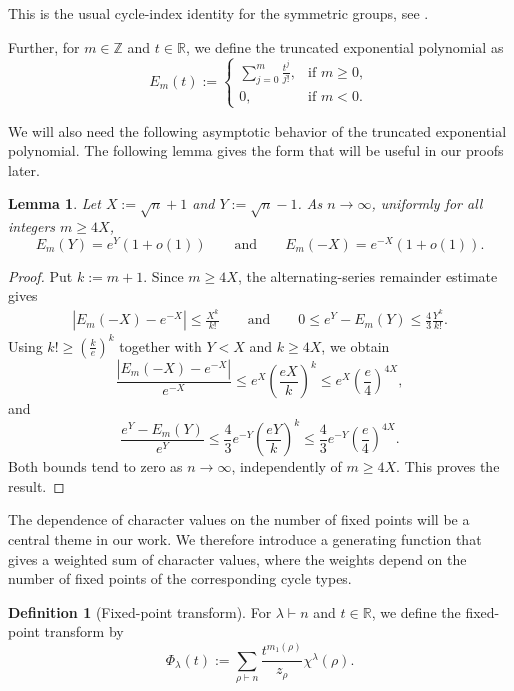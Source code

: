 \documentclass[12pt]{article}
\newtheorem{lemma}{Lemma}[section]
\theoremstyle{definition}
\newtheorem*{definition}{Definition}
\newcommand{\1}{\mathbf 1}
\begin{document}
This is the usual cycle-index identity for the symmetric groups, see \cite[Example: 5.2.10]{Stanley_2023}.

Further, for $m\in\mathbb{Z}$ and $t\in\mathbb{R}$, we define the truncated exponential polynomial as
$$
E_m(t):=
\begin{cases}
\displaystyle\sum_{j=0}^{m}\frac{t^j}{j!},
& \text{if } m\geq 0,\\[2mm]
0,
& \text{if } m<0.
\end{cases}
$$

We will also need the following asymptotic behavior of the truncated exponential polynomial. The following lemma gives the form that will be useful in our proofs later.


\begin{lemma}
Let $X:=\sqrt{n}+1$ and $Y:=\sqrt{n}-1$. 
As $n\to\infty$, uniformly for all integers $m\geq 4X$,
$$
E_m(Y)=e^Y(1+o(1))
\qquad\text{and}\qquad
E_m(-X)=e^{-X}(1+o(1)).
$$
\end{lemma}

\begin{proof}
Put $k:=m+1$. Since $m\geq 4X$, the alternating-series remainder estimate gives
\begin{align*}
    \left|E_m(-X)-e^{-X}\right|
\leq \frac{X^k}{k!}\qquad\text{and}\qquad
0\leq e^Y-E_m(Y)
\leq  \frac{4}{3}\frac{Y^k}{k!}.
\end{align*}
Using $k!\geq \left(\frac{k}{e}\right)^k$ together with $Y<X$ and $k\geq 4X$, we obtain
$$
\frac{\left|E_m(-X)-e^{-X}\right|}{e^{-X}}
\leq
e^X\left(\frac{eX}{k}\right)^k
\leq
e^X\left(\frac{e}{4}\right)^{4X},
$$
and
$$
\frac{e^Y-E_m(Y)}{e^Y}
\leq
\frac{4}{3}e^{-Y}
\left(\frac{eY}{k}\right)^k
\leq
\frac{4}{3}e^{-Y}
\left(\frac{e}{4}\right)^{4X}.
$$
Both bounds tend to zero as $n\to\infty$, independently of $m\geq 4X$. This proves the result.
\end{proof}

The dependence of character values on the number of fixed points will be a central theme in our work. We therefore introduce a generating function that gives a weighted sum of character values, where the weights depend on the number of fixed points of the corresponding cycle types.


\begin{definition}[Fixed-point transform]
For $\lambda\vdash n$ and $t\in\mathbb{R}$, we define the fixed-point transform by
$$
\Phi_\lambda(t):=
\sum_{\rho\vdash n}
\frac{t^{m_1(\rho)}}{z_\rho}\chi^\lambda(\rho).
$$
\end{definition}
\end{document}
